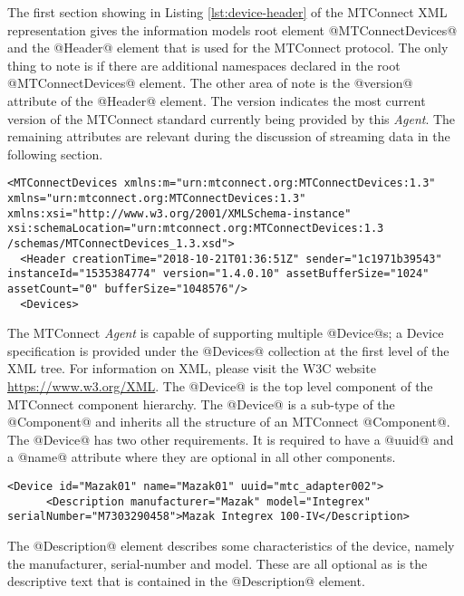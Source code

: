 \lstset{language=XML,numbers=left,xleftmargin=2em}

The first section showing in Listing \ref{lst:device-header} of the MTConnect XML representation gives the information models root element @MTConnectDevices@ and the @Header@ element that is used for the MTConnect protocol. The only thing to note is if there are additional namespaces declared in the root @MTConnectDevices@ element. The other area of note is the @version@ attribute of the @Header@ element.  The version indicates the most current version of the MTConnect standard currently being provided by this \textit{Agent}. The remaining attributes are relevant during the discussion of streaming data in the following section.

\begin{lstlisting}[caption={Device Header},label={lst:device-header}]
<MTConnectDevices xmlns:m="urn:mtconnect.org:MTConnectDevices:1.3" xmlns="urn:mtconnect.org:MTConnectDevices:1.3" xmlns:xsi="http://www.w3.org/2001/XMLSchema-instance" xsi:schemaLocation="urn:mtconnect.org:MTConnectDevices:1.3 /schemas/MTConnectDevices_1.3.xsd">
  <Header creationTime="2018-10-21T01:36:51Z" sender="1c1971b39543" instanceId="1535384774" version="1.4.0.10" assetBufferSize="1024" assetCount="0" bufferSize="1048576"/>
  <Devices>
\end{lstlisting}

The MTConnect \textit{Agent} is capable of supporting multiple @Device@s; a Device specification is provided under the @Devices@ collection at the first level of the XML tree. For information on XML, please visit the W3C website \url{https://www.w3.org/XML}. The @Device@ is the top level component of the MTConnect component hierarchy. The @Device@ is a sub-type of the @Component@ and inherits all the structure of an MTConnect @Component@. The @Device@ has two other requirements. It is required to have a @uuid@ and a @name@ attribute where they are optional in all other components. 

\begin{lstlisting}[firstnumber=last,%
    caption={\texttt{Device} Element Mapping},label={lst:device-model-device}]
    <Device id="Mazak01" name="Mazak01" uuid="mtc_adapter002">
      <Description manufacturer="Mazak" model="Integrex" serialNumber="M7303290458">Mazak Integrex 100-IV</Description>
\end{lstlisting}

The @Description@ element describes some characteristics of the device, namely the manufacturer, serial-number and model. These are all optional as is the descriptive text that is contained in the @Description@ element.

